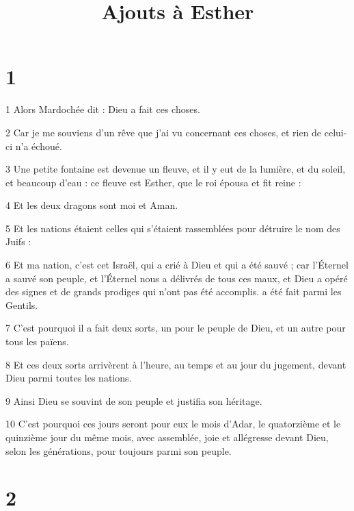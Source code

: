 

\title{Ajouts à Esther}

\chapter{1}

\par 1 Alors Mardochée dit : Dieu a fait ces choses.
\par 2 Car je me souviens d'un rêve que j'ai vu concernant ces choses, et rien de celui-ci n'a échoué.
\par 3 Une petite fontaine est devenue un fleuve, et il y eut de la lumière, et du soleil, et beaucoup d'eau : ce fleuve est Esther, que le roi épousa et fit reine :
\par 4 Et les deux dragons sont moi et Aman.
\par 5 Et les nations étaient celles qui s'étaient rassemblées pour détruire le nom des Juifs :
\par 6 Et ma nation, c'est cet Israël, qui a crié à Dieu et qui a été sauvé ; car l'Éternel a sauvé son peuple, et l'Éternel nous a délivrés de tous ces maux, et Dieu a opéré des signes et de grands prodiges qui n'ont pas été accomplis. a été fait parmi les Gentils.
\par 7 C'est pourquoi il a fait deux sorts, un pour le peuple de Dieu, et un autre pour tous les païens.
\par 8 Et ces deux sorts arrivèrent à l'heure, au temps et au jour du jugement, devant Dieu parmi toutes les nations.
\par 9 Ainsi Dieu se souvint de son peuple et justifia son héritage.
\par 10 C'est pourquoi ces jours seront pour eux le mois d'Adar, le quatorzième et le quinzième jour du même mois, avec assemblée, joie et allégresse devant Dieu, selon les générations, pour toujours parmi son peuple.

\chapter{2}

